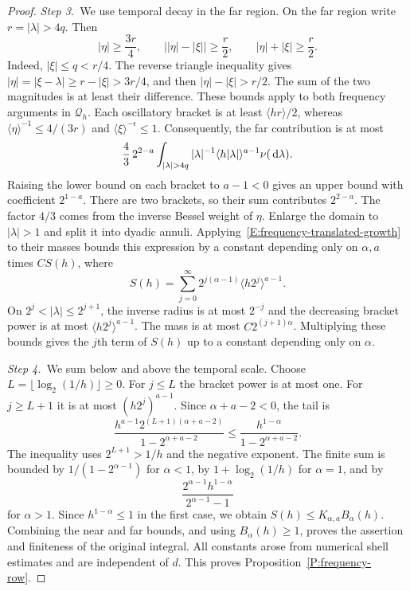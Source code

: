 \begin{proof}
  \medskip
  \noindent\textit{Step 3.~}We use temporal decay in the far region.
  On the far region write $r = |\lambda| > 4q$. Then
  \[
    |\eta| \ge \frac{3r}4,\qquad
    \big||\eta|-|\xi|\big| \ge \frac r2,\qquad
    |\eta|+|\xi| \ge \frac r2.
  \]
  Indeed, $|\xi| \le q < r/4$. The reverse triangle inequality gives $|\eta| =
  |\xi-\lambda| \ge r-|\xi| > 3r/4$, and then $|\eta|-|\xi| > r/2$. The sum of
  the two magnitudes is at least their difference. These bounds apply to both
  frequency arguments in $\mathcal{Q}_h$.
  Each oscillatory bracket is at least $\langle hr\rangle/2$, whereas
  $\langle\eta\rangle^{-1} \le 4/(3r)$ and $\langle\xi\rangle^{-\epsilon} \le
  1$. Consequently, the far contribution is at most
  \[
    \frac43\,2^{2-a}\int_{|\lambda|>4q}
    |\lambda|^{-1}\langle h|\lambda|\rangle^{a-1}\nu(\ud\lambda).
  \]
  Raising the lower bound on each bracket to $a-1 < 0$ gives an upper bound
  with coefficient $2^{1-a}$. There are two brackets, so their sum contributes
  $2^{2-a}$. The factor $4/3$ comes from the inverse Bessel weight of $\eta$.
  Enlarge the domain to $|\lambda| > 1$ and split it into dyadic annuli.
  Applying~\eqref{E:frequency-translated-growth} to their masses bounds this
  expression by a constant depending only on $\alpha,a$ times $C S(h)$, where
  \[
    S(h) = \sum_{j=0}^\infty
    2^{j(\alpha-1)}\langle h2^j\rangle^{a-1}.
  \]
  On $2^j < |\lambda| \le 2^{j+1}$, the inverse radius is at most $2^{-j}$ and
  the decreasing bracket power is at most $\langle h2^j\rangle^{a-1}$. The
  mass is at most $C2^{(j+1)\alpha}$. Multiplying these bounds gives the $j$th
  term of $S(h)$ up to a constant depending only on $\alpha$.

  \medskip
  \noindent\textit{Step 4.~}We sum below and above the temporal scale.
  Choose $L = \lfloor\log_2(1/h)\rfloor \ge 0$. For $j \le L$ the bracket power
  is at most one. For $j \ge L+1$ it is at most $(h2^j)^{a-1}$. Since
  $\alpha+a-2 < 0$, the tail is
  \[
    \frac{h^{a-1}2^{(L+1)(\alpha+a-2)}}{1-2^{\alpha+a-2}}
    \le \frac{h^{1-\alpha}}{1-2^{\alpha+a-2}}.
  \]
  The inequality uses $2^{L+1} > 1/h$ and the negative exponent. The finite sum
  is bounded by $1/(1-2^{\alpha-1})$ for $\alpha < 1$, by $1+\log_2(1/h)$ for
  $\alpha = 1$, and by
  \[
    \frac{2^{\alpha-1}h^{1-\alpha}}{2^{\alpha-1}-1}
  \]
  for $\alpha > 1$. Since $h^{1-\alpha} \le 1$ in the first case, we obtain
  $S(h) \le K_{\alpha,a}B_\alpha(h)$. Combining the near and far bounds, and
  using $B_\alpha(h) \ge 1$, proves the assertion and finiteness of the original
  integral. All constants arose from numerical shell estimates and are
  independent of $d$. This proves Proposition~\ref{P:frequency-row}.
\end{proof}

